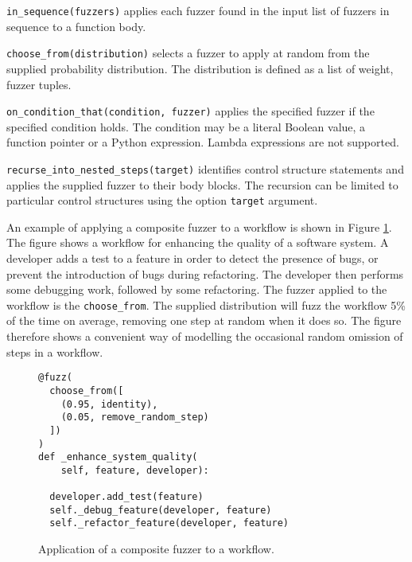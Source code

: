 \documentclass{sig-alternate}
\newenvironment{FunctionList}{%
\lstset{basicstyle=\ttfamily\bfseries\small}
\begin{list}{}{\leftmargin=5pt}
}{\end{list}\lstset{basicstyle=\ttfamily\small}}
\begin{document}
\begin{FunctionList}
\item \lstinline!in_sequence(fuzzers)! applies each fuzzer found in the input
  list of fuzzers in sequence to a function body.

\item \lstinline!choose_from(distribution)! selects a fuzzer to apply at random
  from the supplied probability distribution.  The distribution is defined as a
  list of weight, fuzzer tuples.

\item \lstinline!on_condition_that(condition, fuzzer)! %
  applies the specified fuzzer if the specified condition holds.  The condition
  may be a literal Boolean value, a function pointer or a Python expression.
  Lambda expressions are not supported.

\item \lstinline!recurse_into_nested_steps(target)! identifies
  control structure statements and applies the supplied fuzzer to their body
  blocks.  The recursion can be limited to particular control structures using
  the option \lstinline!target! argument.
\end{FunctionList}

An example of applying a composite fuzzer to a workflow is shown in Figure
\ref{fig:composite}.  The figure shows a workflow for enhancing the quality of a
software system.  A developer adds a test to a feature in order to detect the
presence of bugs, or prevent the introduction of bugs during refactoring.  The
developer then performs some debugging work, followed by some refactoring.  The
fuzzer applied to the workflow is the \lstinline!choose_from!.  The supplied
distribution will fuzz the workflow 5\% of the time on average, removing one
step at random when it does so.  The figure therefore shows a convenient way of
modelling the occasional random omission of steps in a workflow.

\begin{figure}
  \centering

\begin{lstlisting}
@fuzz(
  choose_from([
    (0.95, identity),
    (0.05, remove_random_step)
  ])
)
def _enhance_system_quality(
    self, feature, developer):

  developer.add_test(feature)
  self._debug_feature(developer, feature)
  self._refactor_feature(developer, feature) 
\end{lstlisting}
  
  \caption{Application of a composite fuzzer to a workflow.}
  \label{fig:composite}
\end{figure}
\end{document}
